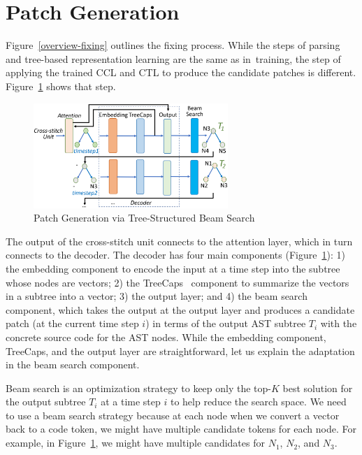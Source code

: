 \section{Patch Generation}
\label{sec:patch-gen}

Figure~\ref{overview-fixing} outlines the fixing process. While the
steps of parsing and tree-based representation learning are the same
as in~train\-ing, the step of applying the trained CCL and CTL to
produce the candidate patches is different. Figure~\ref{fig:patch-gen}
shows that step.

\begin{figure}[t]
	\centering
	\includegraphics[width=2.9in]{graphs/beam-search.png}
        \vspace{-10pt}
	\caption{Patch Generation via Tree-Structured Beam Search}
	\label{fig:patch-gen}
\end{figure}

The output of the cross-stitch unit connects to the attention layer,
which in turn connects to the decoder. The decoder has four main
components (Figure~\ref{fig:patch-gen}): 1) the embedding component to
encode the input at a time step into the subtree whose nodes are
vectors; 2) the TreeCaps~\cite{bui2021treecaps} component to summarize
the vectors in a subtree into a vector; 3) the output layer; and 4)
the beam search component, which takes the output at the output layer
and produces a candidate patch (at the current time step $i$) in terms
of the output AST subtree $T_i$ with the concrete source code for the
AST nodes. While the embedding component, TreeCaps, and the output
layer are straightforward, let us explain the adaptation in the beam
search component.

Beam search is an optimization strategy to keep only the top-$K$ best
solution for the output subtree $T_i$ at a time step $i$ to help
reduce the search space. We need to use a beam search
strategy because at each node when we convert a vector back to a code
token, we might have multiple candidate tokens for each node. For
example, in Figure~\ref{fig:patch-gen}, we might have multiple
candidates for $N_1$, $N_2$, and $N_3$.

